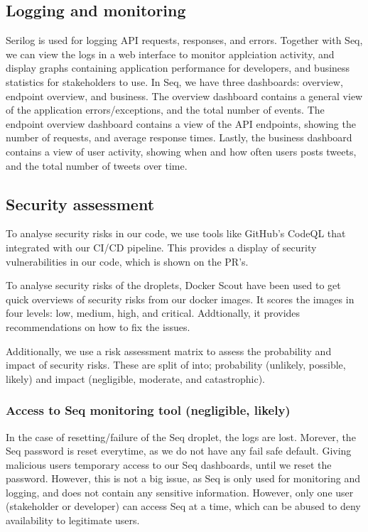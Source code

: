 \subsection{Logging and monitoring}
Serilog is used for logging API requests, responses, and errors.
Together with Seq, we can view the logs in a web interface to monitor 
applciation activity, and display graphs containing application performance 
for developers, and business statistics for stakeholders to use.
In Seq, we have three dashboards: overview, endpoint overview, and business.
The overview dashboard contains a general view of the application 
errors/exceptions, and the total number of events.
The endpoint overview dashboard contains a view of the API endpoints,
showing the number of requests, and average response times.
Lastly, the business dashboard contains a view of user activity,
showing when and how often users posts tweets, and the total number of tweets over time.


\subsection{Security assessment}
To analyse security risks in our code, we use tools like GitHub's CodeQL\cite{codeql} that 
integrated with our CI/CD pipeline.
This provides a display of security vulnerabilities in our code,
which is shown on the PR's.

To analyse security risks of the droplets, Docker Scout have been used to get
quick overviews of security risks from our docker images.
It scores the images in four levels: low, medium, high, and critical.
Addtionally, it provides recommendations on how to fix the issues.


Additionally, we use a risk assessment matrix to assess the probability and impact of security risks. 
These are split of into; probability (unlikely, possible, likely) and impact (negligible, moderate, and catastrophic).

\subsubsection{Access to Seq monitoring tool (negligible, likely)} 
In the case of resetting/failure of the Seq droplet, the logs 
are lost. Morever, the Seq password is reset everytime, as we 
do not have any fail safe default. Giving malicious users temporary 
access to our Seq dashboards, until we reset the password. However, 
this is not a big issue, as Seq is only used for monitoring and logging, 
and does not contain any sensitive information. However, only one user 
(stakeholder or developer) can access Seq at a time, 
which can be abused to deny availability to legitimate users.
      
